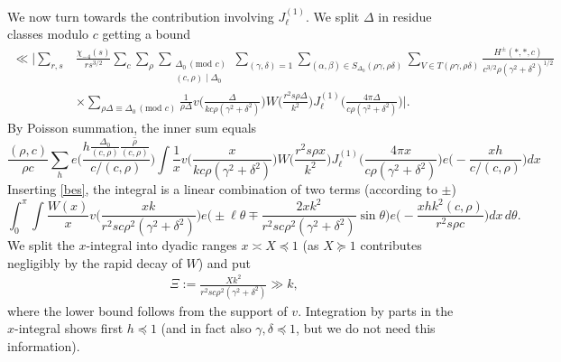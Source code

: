 \documentclass[11pt]{amsart}
\numberwithin{equation}{section}
\theoremstyle{plain}
\theoremstyle{definition}
\renewcommand{\leq}{\le}
\newcommand{\eps}{\varepsilon}
\numberwithin{equation}{section}
\begin{document}
We now turn towards the contribution involving $J_{\ell}^{(1)}$. 
We split $\Delta$ in residue classes modulo $c$ getting a bound
\begin{align}
\ll \Big| \sum_{r, s} &\frac{\chi_{-4}(s)}{rs^{3/2}} \sum_{c} \sum_{\rho}  \sum_{\substack{\Delta_0\, (\text{mod } c)\\ (c, \rho) \mid \Delta_0 }}  \sum_{(\gamma, \delta) = 1} \sum_{(\alpha, \beta) \in S_{\Delta_0}(\rho\gamma, \rho\delta)}
 \sum_{V \in T(\rho\gamma, \rho\delta)}    \frac{H^{\pm}(*, *, c)}{c^{3/2} \rho(\gamma^2 + \delta^2)^{1/2}} \\
 &%
\times  \sum_{\rho \Delta \equiv \Delta_0 \, (\text{mod }c) } \frac{1}{\rho \Delta}v\Big(\frac{\Delta}{kc\rho(\gamma^2 + \delta^2)}\Big) W\Big( \frac{r^2 s \rho \Delta}{k^2}\Big) J_{\ell}^{(1)} \Big(\frac{4\pi \Delta }{c\rho(\gamma^2 + \delta^2)}\Big)\Big|. 
\end{align}
By Poisson summation, the inner sum equals
$$\frac{(\rho, c)}{\rho c} \sum_h e\Big( \frac{h \frac{\Delta_0}{(c, \rho)} \overline{\frac{\rho}{(c, \rho)}}}{c/(c, \rho)}\Big) \int \frac{1}{x}v\Big(\frac{x}{kc\rho(\gamma^2 + \delta^2)}\Big) W\Big( \frac{r^2 s \rho x}{k^2}\Big) J_{\ell}^{(1)} \Big(\frac{4\pi x }{c\rho(\gamma^2 + \delta^2)}\Big) e\Big( - \frac{xh}{c/(c, \rho)} \Big) dx$$
Inserting \eqref{bes}, the integral is a linear combination of two terms (according to $\pm$)
\[ \int_0^{\pi} \int \frac{W(x)}{x}v\Big(\frac{xk}{r^2sc\rho^2(\gamma^2 + \delta^2)}\Big)  e \Big(\pm \ell \theta \mp \frac{2 x  k^2 }{r^2 sc\rho^2(\gamma^2 + \delta^2)} \sin\theta \Big) e\Big( - \frac{xh k^2(c, \rho)}{r^2 s \rho c} \Big) dx \, d\theta. \]
We split the $x$-integral into dyadic ranges $x \asymp X \preccurlyeq 1$ (as $X \succcurlyeq 1$ contributes negligibly by the rapid decay of $W$) and put 
\begin{align} \label{}
\Xi := \frac{Xk^2}{r^2 s c \rho^2 (\gamma ^2 + \delta^2)} \gg k,
\end{align}
 where the lower bound follows from the support of $v$. Integration by parts in the $x$-integral shows first $h\preccurlyeq 1$ %
 (and in fact also $\gamma, \delta \preccurlyeq 1$, but we do not need this information).  
\end{document}

